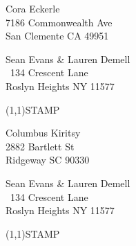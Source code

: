 \documentclass[12pt]{article}
\begin{document}
\begin{center} \begin{Huge} \vspace*{\fill}
Cora Eckerle\\
7186 Commonwealth Ave\\
San Clemente CA 49951\\
\vspace{\fill} \end{Huge} \end{center}

\clearpage

\begin{minipage}{.5\linewidth} \noindent
Sean Evans \& Lauren Demell\\\ 
134 Crescent Lane\\ 
Roslyn Heights NY 11577
\end{minipage}
\begin{minipage}{.5\linewidth \hspace{-.2in} \vspace{-.3in}}
\begin{flushright}
\framebox(1,1){STAMP}
\end{flushright}
\end{minipage}

\begin{center} \begin{Huge} \vspace*{\fill}
Columbus Kiritsy\\
2882 Bartlett St\\
Ridgeway SC 90330\\
\vspace{\fill} \end{Huge} \end{center}

\clearpage

\begin{minipage}{.5\linewidth} \noindent
Sean Evans \& Lauren Demell\\\ 
134 Crescent Lane\\ 
Roslyn Heights NY 11577
\end{minipage}
\begin{minipage}{.5\linewidth \hspace{-.2in} \vspace{-.3in}}
\begin{flushright}
\framebox(1,1){STAMP}
\end{flushright}
\end{minipage}
\end{document}
